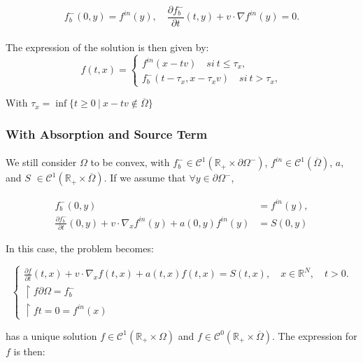 \documentclass[a4paper, 11pt]{article}
\begin{document}
\[ f_b^-(0,y) = f^{in}(y), \quad \frac{\partial f_b^-}{\partial t}(t,y)+v \cdot \nabla f^{in}(y)=0. \]

\paragraph{}

The expression of the solution is then given by: 
\[
\boxed{
	f(t,x)= 
	\begin{cases}
		f^{in}(x-tv) \quad si~ t \leq \tau_x ,\\
		f_b^-(t-\tau_x,x-\tau_xv) \quad si~ t > \tau_x ,
	\end{cases}
}
\]

With $\tau_x= \inf \{t \geq 0~ | ~ x-tv \notin \overline{\Omega}\}$

\subsubsection{With Absorption and Source Term}

\paragraph{}
We still consider $\Omega$ to be convex, with $f_b^- \in \mathcal{C}^1(\mathbb{R}_+ \times \partial \Omega^-)$, $f^{in} \in \mathcal{C}^1(\overline{\Omega})$, $a$, and $S$ $\in \mathcal{C}^1(\mathbb{R}_+ \times \overline{\Omega})$. If we assume that $\forall y \in \partial \Omega^-$,

\[
\begin{aligned}
	f_b^-(0,y) &= f^{in}(y), \\
	\frac{\partial f_b^-}{\partial t}(0,y) + v \cdot \nabla_x f^{in}(y) + a(0,y)f^{in}(y)&=S(0,y)
\end{aligned}
\]



In this case, the problem becomes:

\[
\begin{cases}
	\frac{\partial f}{\partial t}(t,x)+v \cdot \nabla_x f(t,x)+ a(t,x)f(t,x)=S(t,x), \quad x \in \mathbb{R}^N, \quad t>0.\\
	\restriction{f}{\partial \Omega}= f_b^-\\
	\restriction{f}{t=0}= f^{in}(x)
\end{cases}
\]

has a unique solution $f \in \mathcal{C}^1(\mathbb{R}_+ \times \Omega)$ and $f \in \mathcal{C}^0(\mathbb{R}_+ \times \overline{\Omega})$. The expression for $f$ is then:
\end{document}
